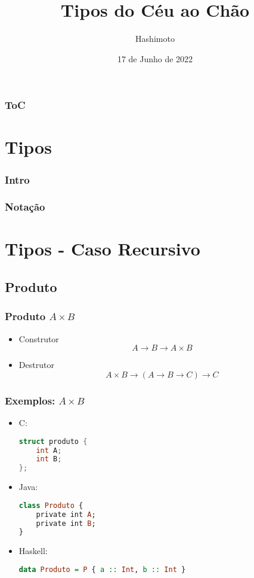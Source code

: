 \documentclass{beamer}
\title{Tipos do Céu ao Chão}
\author{Hashimoto}
\date{17 de Junho de 2022}
\begin{document}
\begin{frame}
    \titlepage
\end{frame}

\begin{frame}
    \frametitle{ToC}
    \tableofcontents[hideallsubsections]
\end{frame}

\section{Tipos}
\begin{frame}
    \frametitle{Intro}
\end{frame}

\begin{frame}
    \frametitle{Notação}
\end{frame}

\section{Tipos - Caso Recursivo}
\subsection{Produto}
\begin{frame}
    \frametitle{Produto \(A \times B\)}
    \begin{itemize}
        \item Construtor
            \[
                A \to B \to A \times B
            \]
        \item Destrutor
            \[
                A \times B \to (A \to B \to C) \to C
            \]
    \end{itemize}
\end{frame}

\begin{frame}[fragile]
    \frametitle{Exemplos: \(A \times B\)}
    \begin{itemize}
        \item C:
        \begin{lstlisting}[language=C]
struct produto {
    int A;
    int B;
};
        \end{lstlisting}
        \item Java:
        \begin{lstlisting}[language=Haskell]
class Produto {
    private int A;
    private int B;
}
        \end{lstlisting}
        \item Haskell:
        \begin{lstlisting}[language=Haskell]
data Produto = P { a :: Int, b :: Int }
        \end{lstlisting}
    \end{itemize}
\end{frame}
\end{document}

